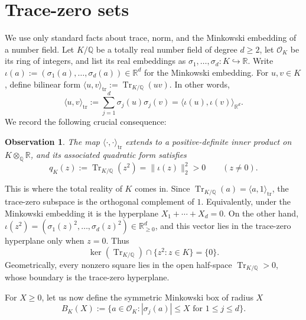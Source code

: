\documentclass[11pt,reqno]{amsart}
\newtheorem{observation}[observation]{Observation}
\theoremstyle{definition}
\theoremstyle{remark}
\newcommand{\R}{\mathbb{R}}
\newcommand{\Q}{\mathbb{Q}}
\newcommand{\OK}{\mathcal{O}_K}
\newcommand{\Tr}{\operatorname{Tr}}
\begin{document}
\section{Trace-zero sets}
\label{sec:trace}

We use only standard facts about trace, norm, and the Minkowski embedding
of a number field. Let $K/\Q$ be
a totally real number field of degree $d\ge2$, let $\OK$ be its ring of
integers, and list its real embeddings as $\sigma_1,\ldots,\sigma_d:K\hookrightarrow\R$. Write $\iota(a):=(\sigma_1(a),\ldots,\sigma_d(a)) \in \mathbb{R}^{d}$ for the Minkowski embedding. For $u,v\in K$, define bilinear form $\langle u,v\rangle_{\mathrm{tr}}:=\Tr_{K/\Q}(uv)$. In other words,
\begin{equation}
\label{eq:trace-inner-product}
        \langle u,v\rangle_{\mathrm{tr}}
        :=\sum_{j=1}^d\sigma_j(u)\sigma_j(v)
        =\langle\iota(u),\iota(v)\rangle_{\R^d}.
\end{equation}
We record the following crucial consequence:

\begin{observation}
\label{lem:positive-trace-form}
The map $\langle\cdot,\cdot\rangle_{\mathrm{tr}}$ extends to a positive-definite inner product on
$K\otimes_{\Q}\R$, and its associated quadratic form satisfies
\begin{equation}
\label{eq:positive-trace-form}
        q_K(z):=\Tr_{K/\Q}(z^2)
        =\|\iota(z)\|_2^2>0
        \qquad(z\ne0).
\end{equation}
\end{observation}

This is where the total reality of $K$ comes in. Since
$\Tr_{K/\Q}(a)=\langle a,1\rangle_{\mathrm{tr}}$, the trace-zero subspace is the orthogonal
complement of $1$.  Equivalently, under the Minkowski embedding it is
the hyperplane $X_1+\cdots+X_d=0$. On the other hand, $\iota(z^2)=(\sigma_1(z)^2,\ldots,\sigma_d(z)^2)\in\R_{\ge0}^d$, and this vector lies in the trace-zero hyperplane only when $z=0$. Thus
\begin{equation}
\label{eq:trace-zero-no-squares}
        \ker(\Tr_{K/\Q})\cap\{z^2:z\in K\}=\{0\}.
\end{equation}
Geometrically, every nonzero square lies in the open half-space
$\Tr_{K/\Q}>0$, whose boundary is the trace-zero hyperplane.

For $X\ge0$, let us now define the symmetric Minkowski box of radius $X$
\begin{equation}
\label{eq:BK}
        B_K(X)
        :=
        \{a\in\OK:|\sigma_j(a)|\le X\text{ for }1\le j\le d\}.
\end{equation}
\end{document}
